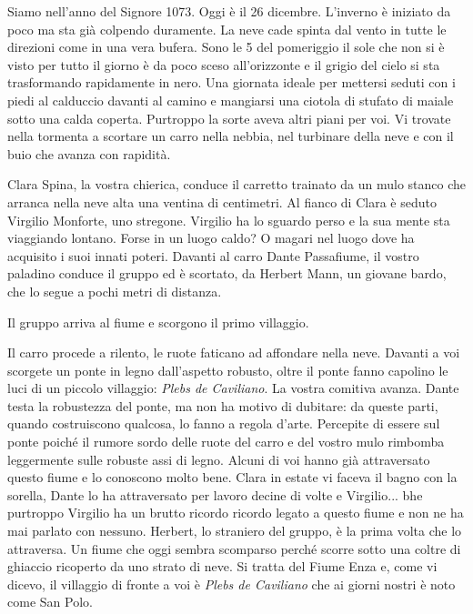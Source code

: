 \documentclass[letterpaper,twocolumn,openany,nodeprecatedcode]{dndbook}
\begin{document}
\begin{DndReadAloud}
Siamo nell'anno del Signore 1073. Oggi è il 26 dicembre. L'inverno è iniziato da poco ma sta già colpendo duramente. La neve cade spinta dal vento in tutte le direzioni come in una vera bufera. Sono le 5 del pomeriggio il sole che non si è visto per tutto il giorno è da poco sceso all'orizzonte e il grigio del cielo si sta trasformando rapidamente in nero. Una giornata ideale per mettersi seduti con i piedi al calduccio davanti al camino e mangiarsi una ciotola di stufato di maiale sotto una calda coperta. Purtroppo la sorte aveva altri piani per voi. Vi trovate nella tormenta a scortare un carro nella nebbia, nel turbinare della neve e con il buio che avanza con rapidità.

Clara Spina, la vostra chierica, conduce il carretto trainato da un mulo stanco che arranca nella neve alta una ventina di centimetri. Al fianco di Clara è seduto Virgilio Monforte, uno stregone. Virgilio ha lo sguardo perso e la sua mente sta viaggiando lontano. Forse in un luogo caldo? O magari nel luogo dove ha acquisito i suoi innati poteri. Davanti al carro Dante Passafiume, il vostro paladino conduce il gruppo ed è scortato, da Herbert Mann, un giovane bardo, che lo segue a pochi metri di distanza. 
\end{DndReadAloud}

Il gruppo arriva al fiume e scorgono il primo villaggio.

\begin{DndReadAloud}
Il carro procede a rilento, le ruote faticano ad affondare nella neve. Davanti a voi scorgete un ponte in legno dall'aspetto robusto, oltre il ponte fanno capolino le luci di un piccolo villaggio: \textit{Plebs de Caviliano}. La vostra comitiva avanza. Dante testa la robustezza del ponte, ma non ha motivo di dubitare: da queste parti, quando costruiscono qualcosa, lo fanno a regola d'arte. Percepite di essere sul ponte poiché il rumore sordo delle ruote del carro e del vostro mulo rimbomba leggermente sulle robuste assi di legno. Alcuni di voi hanno già attraversato questo fiume e lo conoscono molto bene. Clara in estate vi faceva il bagno con la sorella, Dante lo ha attraversato per lavoro decine di volte e Virgilio... bhe purtroppo Virgilio ha un brutto ricordo ricordo legato a questo fiume e non ne ha mai parlato con nessuno. Herbert, lo straniero del gruppo, è la prima volta che lo attraversa. Un fiume che oggi sembra scomparso perché scorre sotto una coltre di ghiaccio ricoperto da uno strato di neve. Si tratta del Fiume Enza e, come vi dicevo, il villaggio di fronte a voi è  \textit{Plebs de Caviliano} che ai giorni nostri è noto come San Polo.
\end{DndReadAloud}
\end{document}

